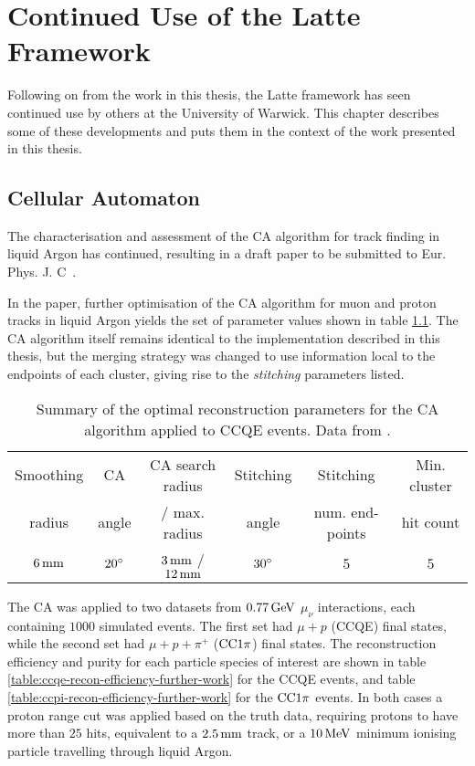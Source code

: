 \chapter{Continued Use of the Latte Framework}

Following on from the work in this thesis, the Latte framework has seen continued use by others at the University of Warwick. This chapter describes some of these developments and puts them in the context of the work presented in this thesis.

\section{Cellular Automaton}
The characterisation and assessment of the \ac{CA} algorithm for track finding in liquid Argon has continued, resulting in a draft paper to be submitted to Eur. Phys. J. C~\citep{Back2013}.

In the paper, further optimisation of the CA algorithm for muon and proton tracks in liquid Argon yields the set of parameter values shown in table \ref{table:opt-params-further-work}. The CA algorithm itself remains identical to the implementation described in this thesis, but the merging strategy was changed to use information local to the endpoints of each cluster, giving rise to the \emph{stitching} parameters listed.

\begin{table}
\centering
\begin{tabular}{*{6}{c}}
Smoothing & CA    & CA search radius & Stitching & Stitching       & Min. cluster \\
radius    & angle & / max. radius    & angle     & num. end-points & hit count \\
\hline
\hline
$6\,\mathrm{mm}$ & $20^\circ$ & $3\,\mathrm{mm}$ / $12\,\mathrm{mm}$ & $30^\circ$ & $5$ & $5$ \\
\hline
\end{tabular}
\caption[CA reconstruction parameters for CCQE events]{\label{table:opt-params-further-work}Summary of the optimal reconstruction parameters for the CA algorithm applied to CCQE events. Data from \cite{Back2013}.}
\end{table}

The CA was applied to two datasets from $0.77\,\mathrm{GeV}$ $\mu_\nu$ interactions, each containing $1000$ simulated events. The first set had $\mu + p$ (CCQE) final states, while the second set had $\mu + p + \pi^+$ ($\mathrm{CC}1\pi$) final states. The reconstruction efficiency and purity for each particle species of interest are shown in table \ref{table:ccqe-recon-efficiency-further-work} for the CCQE events, and table \ref{table:ccpi-recon-efficiency-further-work} for the $\mathrm{CC}1\pi$ events. In both cases a proton range cut was applied based on the truth data, requiring protons to have more than $25$ hits, equivalent to a $2.5\,\mathrm{mm}$ track, or a $10\,\mathrm{MeV}$ minimum ionising particle travelling through liquid Argon.


